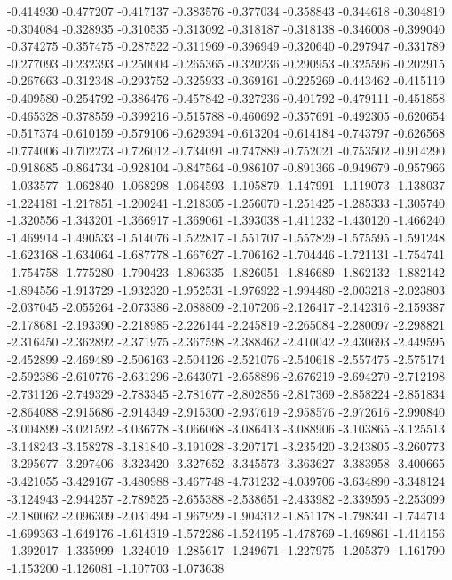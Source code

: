 -0.414930
-0.477207
-0.417137
-0.383576
-0.377034
-0.358843
-0.344618
-0.304819
-0.304084
-0.328935
-0.310535
-0.313092
-0.318187
-0.318138
-0.346008
-0.399040
-0.374275
-0.357475
-0.287522
-0.311969
-0.396949
-0.320640
-0.297947
-0.331789
-0.277093
-0.232393
-0.250004
-0.265365
-0.320236
-0.290953
-0.325596
-0.202915
-0.267663
-0.312348
-0.293752
-0.325933
-0.369161
-0.225269
-0.443462
-0.415119
-0.409580
-0.254792
-0.386476
-0.457842
-0.327236
-0.401792
-0.479111
-0.451858
-0.465328
-0.378559
-0.399216
-0.515788
-0.460692
-0.357691
-0.492305
-0.620654
-0.517374
-0.610159
-0.579106
-0.629394
-0.613204
-0.614184
-0.743797
-0.626568
-0.774006
-0.702273
-0.726012
-0.734091
-0.747889
-0.752021
-0.753502
-0.914290
-0.918685
-0.864734
-0.928104
-0.847564
-0.986107
-0.891366
-0.949679
-0.957966
-1.033577
-1.062840
-1.068298
-1.064593
-1.105879
-1.147991
-1.119073
-1.138037
-1.224181
-1.217851
-1.200241
-1.218305
-1.256070
-1.251425
-1.285333
-1.305740
-1.320556
-1.343201
-1.366917
-1.369061
-1.393038
-1.411232
-1.430120
-1.466240
-1.469914
-1.490533
-1.514076
-1.522817
-1.551707
-1.557829
-1.575595
-1.591248
-1.623168
-1.634064
-1.687778
-1.667627
-1.706162
-1.704446
-1.721131
-1.754741
-1.754758
-1.775280
-1.790423
-1.806335
-1.826051
-1.846689
-1.862132
-1.882142
-1.894556
-1.913729
-1.932320
-1.952531
-1.976922
-1.994480
-2.003218
-2.023803
-2.037045
-2.055264
-2.073386
-2.088809
-2.107206
-2.126417
-2.142316
-2.159387
-2.178681
-2.193390
-2.218985
-2.226144
-2.245819
-2.265084
-2.280097
-2.298821
-2.316450
-2.362892
-2.371975
-2.367598
-2.388462
-2.410042
-2.430693
-2.449595
-2.452899
-2.469489
-2.506163
-2.504126
-2.521076
-2.540618
-2.557475
-2.575174
-2.592386
-2.610776
-2.631296
-2.643071
-2.658896
-2.676219
-2.694270
-2.712198
-2.731126
-2.749329
-2.783345
-2.781677
-2.802856
-2.817369
-2.858224
-2.851834
-2.864088
-2.915686
-2.914349
-2.915300
-2.937619
-2.958576
-2.972616
-2.990840
-3.004899
-3.021592
-3.036778
-3.066068
-3.086413
-3.088906
-3.103865
-3.125513
-3.148243
-3.158278
-3.181840
-3.191028
-3.207171
-3.235420
-3.243805
-3.260773
-3.295677
-3.297406
-3.323420
-3.327652
-3.345573
-3.363627
-3.383958
-3.400665
-3.421055
-3.429167
-3.480988
-3.467748
-4.731232
-4.039706
-3.634890
-3.348124
-3.124943
-2.944257
-2.789525
-2.655388
-2.538651
-2.433982
-2.339595
-2.253099
-2.180062
-2.096309
-2.031494
-1.967929
-1.904312
-1.851178
-1.798341
-1.744714
-1.699363
-1.649176
-1.614319
-1.572286
-1.524195
-1.478769
-1.469861
-1.414156
-1.392017
-1.335999
-1.324019
-1.285617
-1.249671
-1.227975
-1.205379
-1.161790
-1.153200
-1.126081
-1.107703
-1.073638
